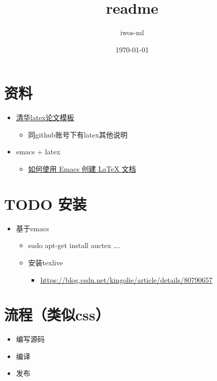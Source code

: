 \documentclass[11pt]{article}
\author{iwos-ml}
\date{\today}
\title{readme}
\begin{document}
\maketitle
\tableofcontents

\section{资料}
\label{sec-1}
\begin{itemize}
\item \href{https://github.com/xueruini/thuthesis}{清华latex论文模板}
\begin{itemize}
\item 同github账号下有latex其他说明
\end{itemize}
\item emacs + latex
\begin{itemize}
\item \href{https://linux.cn/article-10269-1.html}{如何使用 Emacs 创建 \LaTeX{} 文档}
\end{itemize}
\end{itemize}

\section{{\bfseries\sffamily TODO} 安装}
\label{sec-2}
\begin{itemize}
\item 基于emacs
\begin{itemize}
\item sudo apt-get install auctex
\ldots{}.
\item 安装texlive
\begin{itemize}
\item \url{https://blog.csdn.net/kingolie/article/details/80790657}
\end{itemize}
\end{itemize}
\end{itemize}


\section{流程（类似css）}
\label{sec-3}
\begin{itemize}
\item 编写源码
\item 编译
\item 发布
\end{itemize}
\end{document}
